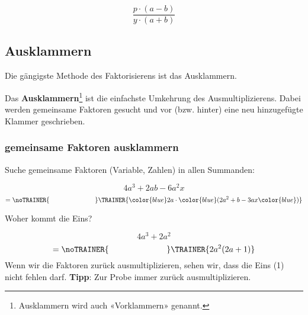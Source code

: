 $$\frac{p\cdot{}(a-b)}{y\cdot{}(a+b)}$$

\newpage

\subsection{Ausklammern}
Die gängigste Methode des Faktorisierens ist das Ausklammern.

Das \textbf{Ausklammern}\footnote{Ausklammern wird auch «Vorklammern» genannt.} ist die einfachste Umkehrung des Ausmultiplizierens.
Dabei werden gemeinsame Faktoren gesucht und vor (bzw. hinter) eine
neu hinzugefügte Klammer geschrieben.

\subsubsection{gemeinsame Faktoren ausklammern}
Suche gemeinsame Faktoren (Variable, Zahlen) in allen Summanden:

\begin{beispiel}{}{}
  $$4a^3 + 2ab -6a^2x$$
  $$=\noTRAINER{\hspace{7em}}\TRAINER{ {\color{blue}2a}\cdot{}{\color{blue}(}2a^2+b -3ax{\color{blue})}}$$
\end{beispiel}

\begin{beispiel}{Woher kommt die Eins?}{}

$$4a^3 + 2a^2$$
$$=\noTRAINER{\hspace{7em}}\TRAINER{2a^2(2a + 1)}$$
Wenn wir die Faktoren zurück ausmultiplizieren, sehen wir, dass die
Eins (1) nicht fehlen darf. \textbf{Tipp}: Zur Probe immer zurück ausmultiplizieren.
\end{beispiel}




\newcommand{\olatAB}[2]{\subsection*{Aufgaben}
\aufgabenFarbe{OLAT #1. Aufg. #2}
\platzFuerBerechnungenBisEndeSeite{}}



